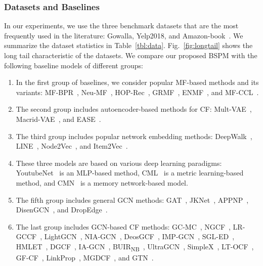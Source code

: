 \documentclass[sigconf,natbib=true]{acmart}
\begin{document}
\subsubsection{Datasets and Baselines}

In our experiments, we use the three benchmark datasets that are the most frequently used in the literature: Gowalla, Yelp2018, and Amazon-book~\cite{Wang19NGCF,chen20LRGCCF,He20LightGCN}.  We summarize the dataset statistics in Table~\ref{tbl:data}. Fig.~\ref{fig:longtail} shows the long tail characteristic of the datasets. We compare our proposed BSPM with the following baseline models of different groups:

\begin{enumerate}
    \item In the first group of baselines, we consider popular MF-based methods and its variants: MF-BPR~\cite{rendle2009BPR}, Neu-MF~\cite{He2017NCF}, HOP-Rec~\cite{yang2018hop},  GRMF~\cite{Rao2015GRMF}, ENMF~\cite{chen2020ENMF}, and MF-CCL~\cite{mao2021simplex}.
    \item The second group includes autoencoder-based methods for CF: Mult-VAE~\cite{Liang2018VAECF}, Macrid-VAE~\cite{ma2019macridvae}, and EASE~\cite{steck2019EASE}.  
    \item The third group includes popular network embedding methods: DeepWalk~\cite{perozzi2014deepwalk}, LINE~\cite{tang2015line}, Node2Vec~\cite{grover2016node2vec}, and Item2Vec~\cite{Oren2016Item2Vec}.
    \item These three models are based on various deep learning paradigms: YoutubeNet~\cite{Covington2016YoutubeNet} is an MLP-based method, CML~\cite{hsieh2017cml} is a metric learning-based method, and CMN~\cite{Ebesu2018CMN} is a memory network-based model.
    \item The fifth group includes general GCN methods: GAT~\cite{velickovic2018GAT}, JKNet~\cite{xu2018jknet}, APPNP~\cite{Klicpera2019APPNP}, DisenGCN~\cite{ma2019DisenGCN}, and DropEdge~\cite{rong2020dropedge}.
    \item The last group includes GCN-based CF methods: GC-MC~\cite{Rianne2017GCMC}, NGCF~\cite{Wang19NGCF}, LR-GCCF~\cite{chen20LRGCCF},  LightGCN~\cite{He20LightGCN}, NIA-GCN~\cite{sun2020NIA-GCN}, DeosGCF~\cite{liu2020deoscillated}, IMP-GCN~\cite{liu2021IMP-GCN}, SGL-ED~\cite{Wu2021SGLED}, HMLET~\cite{kong2022hmlet}, DGCF~\cite{Xiang2020DGCF19}, IA-GCN~\cite{zhang2022iagcn}, BUIR\textsubscript{NB}~\cite{lee2021BUIR}, UltraGCN~\cite{Mao21UltraGCN}, SimpleX~\cite{mao2021simplex}, LT-OCF~\cite{choi2021ltocf}, GF-CF~\cite{Shen21GFCF}, LinkProp~\cite{fu2022revisiting}, MGDCF~\cite{hu2022mgdcf}, and GTN~\cite{fan2022GTN}.
\end{enumerate}
\end{document}
